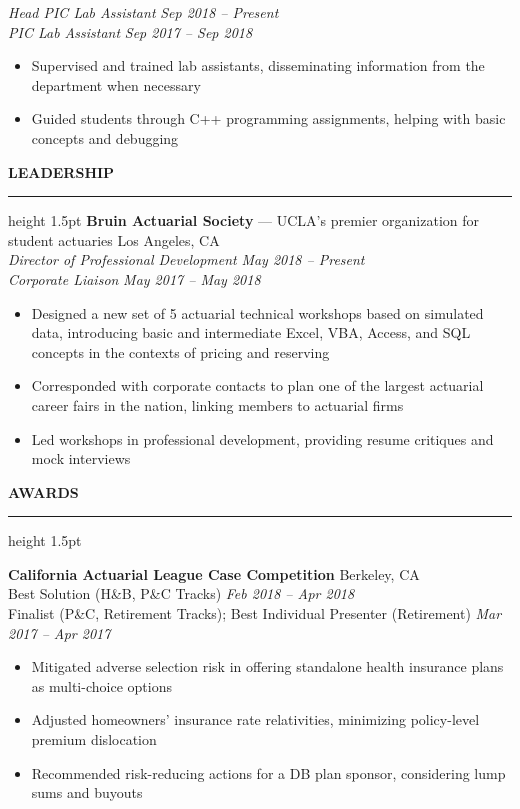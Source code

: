 \documentclass[11pt,letterpaper]{article}
\newcommand{\sectline}{\vspace{4pt}\hrule height 1.5pt\vspace{4pt}}
\newcommand{\sectspace}{\vspace{8pt}}
\begin{document}
\textit{Head PIC Lab Assistant} \hfill \textit{Sep 2018 -- Present} \\
\textit{PIC Lab Assistant} \hfill \textit{Sep 2017 -- Sep 2018}
\begin{itemize}
	\item Supervised and trained lab assistants, disseminating information from the department when necessary
	\item Guided students through C++ programming assignments, helping with basic concepts and debugging
\end{itemize}
\sectspace


\textbf{LEADERSHIP} \sectline
\textbf{Bruin Actuarial Society} --- UCLA's premier organization for student actuaries \hfill Los Angeles, CA \\
\textit{Director of Professional Development} \hfill \textit{May 2018 -- Present} \\
\textit{Corporate Liaison} \hfill \textit{May 2017 -- May 2018}
\begin{itemize}
	\item Designed a new set of 5 actuarial technical workshops based on simulated data, introducing basic and intermediate Excel, VBA, Access, and SQL concepts in the contexts of pricing and reserving
	\item Corresponded with corporate contacts to plan one of the largest actuarial career fairs in the nation, linking members to actuarial firms
	\item Led workshops in professional development, providing resume critiques and mock interviews
\end{itemize}
\sectspace

\textbf{AWARDS} \sectline

\textbf{California Actuarial League Case Competition} \hfill Berkeley, CA \\
Best Solution (H\&B, P\&C Tracks) \hfill \textit{Feb 2018 -- Apr 2018} \\
Finalist (P\&C, Retirement Tracks); Best Individual Presenter (Retirement) \hfill \textit{Mar 2017 -- Apr 2017} 
\begin{itemize}
	\item Mitigated adverse selection risk in offering standalone health insurance plans as multi-choice options
	\item Adjusted homeowners' insurance rate relativities, minimizing policy-level premium dislocation 
	\item Recommended risk-reducing actions for a DB plan sponsor, considering lump sums and buyouts 
\end{itemize}
\end{document}
